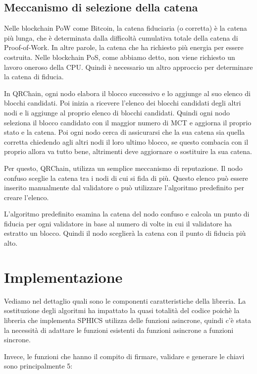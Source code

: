\subsection{Meccanismo di selezione della catena}
Nelle blockchain PoW come Bitcoin, la catena fiduciaria (o corretta) è la catena più lunga, che è determinata dalla difficoltà cumulativa totale della catena di Proof-of-Work. In altre parole, la catena che ha richiesto più energia per essere costruita.
Nelle blockchain PoS, come abbiamo detto, non viene richiesto un lavoro oneroso della CPU. Quindi è necessario un altro approccio per determinare la catena di fiducia.

In QRChain, ogni nodo elabora il blocco successivo e lo aggiunge al suo elenco di blocchi candidati. Poi inizia a ricevere l'elenco dei blocchi candidati degli altri nodi e li aggiunge al proprio elenco di blocchi candidati.
Quindi ogni nodo seleziona il blocco candidato con il maggior numero di MCT e aggiorna il proprio stato e la catena.
Poi ogni nodo cerca di assicurarsi che la sua catena sia quella corretta chiedendo agli altri nodi il loro ultimo blocco, se questo combacia con il proprio allora va tutto bene, altrimenti deve aggiornare o sostituire la sua catena.

Per questo, QRChain, utilizza un semplice meccanismo di reputazione. Il nodo confuso sceglie la catena tra i nodi di cui si fida di più. Questo elenco può essere inserito manualmente dal validatore o può utilizzare l'algoritmo predefinito per creare l'elenco.

L'algoritmo predefinito esamina la catena del nodo confuso e calcola un punto di fiducia per ogni validatore in base al numero di volte in cui il validatore ha estratto un blocco.
Quindi il nodo sceglierà la catena con il punto di fiducia più alto.

\section{Implementazione}
Vediamo nel dettaglio quali sono le componenti caratteristiche della libreria. La sostituzione degli algoritmi ha impattato la quasi totalità del codice poichè la libreria che implementa SPHICS utilizza delle funzioni asincrone, quindi c'è stata la necessità di adattare le funzioni esistenti da funzioni asincrone a funzioni sincrone.

Invece, le funzioni che hanno il compito di firmare, validare e generare le chiavi sono principalmente 5:

